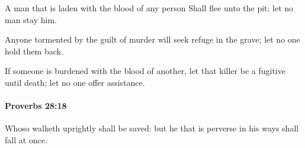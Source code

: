 			\begin{versebox}
					\item[BHS] 
					\item[ASV] A man that is laden with the blood of any person Shall flee unto the pit; let no man stay him.
					\item[NIV] Anyone tormented by the guilt of murder will seek refuge in the grave; let no one hold them back.
					\item[NRSV] If someone is burdened with the blood of another, let that killer be a fugitive until death; let no one offer assistance.
			\end{versebox}

		\paragraph{Proverbs 28:18} %
			\label{PROVERBS-28-18}

			Whoso walketh uprightly shall be saved: but he that is perverse in his ways shall fall at once.

